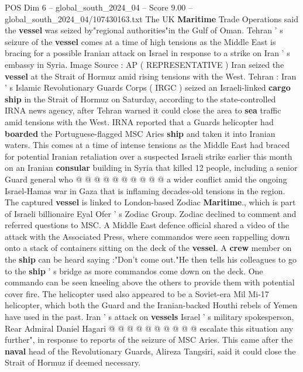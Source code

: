 \begin{textsample}{POS Dim 6 – global\_south\_2024\_04 – Score 9.00 – global\_south\_2024\_04/107430163.txt}  \label{ex:f6_pos_122}
The UK \textbf{Maritime} Trade Operations said the \textbf{vessel} was seized by"regional authorities"in the Gulf of Oman.
Tehran ' s seizure of the \textbf{vessel} comes at a time of high tensions as the Middle East is bracing for a possible Iranian attack on Israel in response to a strike on Iran ' s embassy in Syria.
Image Source : AP ( REPRESENTATIVE ) Iran seized the \textbf{vessel} at the Strait of Hormuz amid rising tensions with the West.
Tehran : Iran ' s Islamic Revolutionary Guards Corps ( IRGC ) seized an Israeli-linked \textbf{cargo} \textbf{ship} in the Strait of Hormuz on Saturday, according to the state-controlled IRNA news agency, after Tehran warned it could close the area to \textbf{sea} traffic amid tensions with the West.
IRNA reported that a Guards helicopter had \textbf{boarded} the Portuguese-flagged MSC Aries \textbf{ship} and taken it into Iranian waters.
This comes at a time of intense tensions as the Middle East had braced for potential Iranian retaliation over a suspected Israeli strike earlier this month on an Iranian \textbf{consular} building in Syria that killed 12 people, including a senior Guard general who @ @ @ @ @ @ @ @ @ @ a wider conflict amid the ongoing Israel-Hamas war in Gaza that is inflaming decades-old tensions in the region.
The captured \textbf{vessel} is linked to London-based Zodiac \textbf{Maritime}., which is part of Israeli billionaire Eyal Ofer ' s Zodiac Group.
Zodiac declined to comment and referred questions to MSC.
A Middle East defence official shared a video of the attack with the Associated Press, where commandos were seen rappelling down onto a stack of containers sitting on the deck of the \textbf{vessel}.
A \textbf{crew} member on the \textbf{ship} can be heard saying :"Don't come out."He then tells his colleagues to go to the \textbf{ship} ' s bridge as more commandos come down on the deck.
One commando can be seen kneeling above the others to provide them with potential cover fire.
The helicopter used also appeared to be a Soviet-era Mil Mi-17 helicopter, which both the Guard and the Iranian-backed Houthi rebels of Yemen have used in the past.
Iran ' s attack on \textbf{vessels} Israel ' s military spokesperson, Rear Admiral Daniel Hagari @ @ @ @ @ @ @ @ @ @ escalate this situation any further", in response to reports of the seizure of MSC Aries.
This came after the \textbf{naval} head of the Revolutionary Guards, Alireza Tangsiri, said it could close the Strait of Hormuz if deemed necessary.

\end{textsample}
